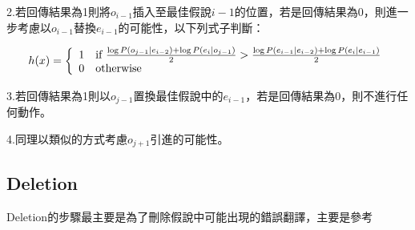 2.若回傳結果為1則將$o_{i-1}$插入至最佳假說$i-1$的位置，若是回傳結果為0，則進一步考慮以$o_{i-1}$替換$e_{i-1}$的可能性，以下列式子判斷：

\begin{equation} 
	  h(x) = \left\{    
	    \begin{array}{ll}
1         & \mbox{if } {{\log P(o_{j - 1} |e_{i - 2} ) + \log P(e_i |o_{j - 1} )} \over 2} > {{\log P(e_{i - 1} |e_{i - 2} ) + \log P(e_i |e_{i - 1} )} \over 2} \\
0         & \mbox{otherwise}
    \end{array}
  \right.
  \label{eq:ins}
\end{equation}

3.若回傳結果為1則以$o_{j-1}$置換最佳假說中的$e_{i-1}$，若是回傳結果為0，則不進行任何動作。


4.同理以類似的方式考慮$o_{j+1}$引進的可能性。


\subsection{Deletion}
\label{sec:Deletion}

Deletion的步驟最主要是為了刪除假說中可能出現的錯誤翻譯，主要是參考